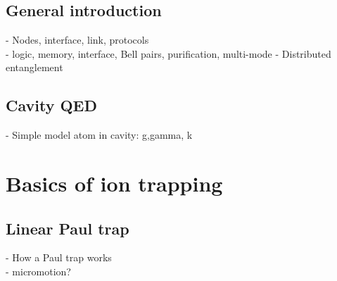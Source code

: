 \subsection{General introduction}
- Nodes, interface, link, protocols\\
- logic, memory, interface, Bell pairs, purification, multi-mode
- Distributed entanglement
\subsection{Cavity QED}
- Simple model atom in cavity: g,gamma, k
\section{Basics of ion trapping}
\subsection{Linear Paul trap}
- How a Paul trap works\\
- micromotion?
